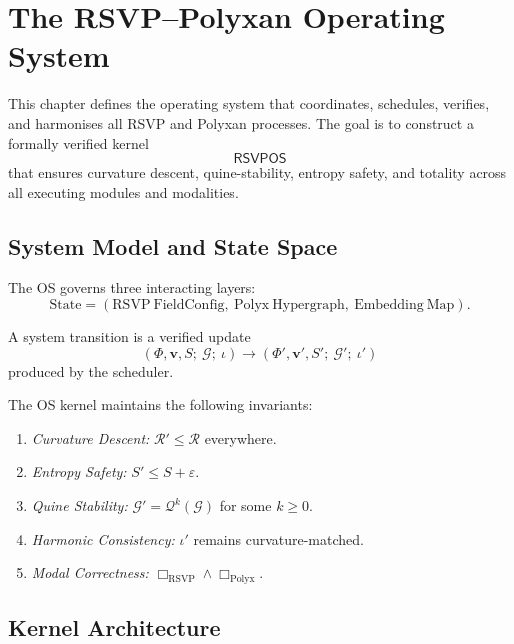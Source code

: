 \chapter{The RSVP--Polyxan Operating System}
\label{ch:60}

This chapter defines the operating system that coordinates, schedules,
verifies, and harmonises all RSVP and Polyxan processes.  
The goal is to construct a formally verified kernel  
\[
\mathsf{RSVPOS}
\]
that ensures curvature descent, quine-stability, entropy safety, and totality
across all executing modules and modalities.

\section{System Model and State Space}
\label{sec:60:model}

The OS governs three interacting layers:
\[
\mathrm{State}
=
(\mathrm{RSVP\ FieldConfig},\ 
 \mathrm{Polyx\ Hypergraph},\
 \mathrm{Embedding\ Map}).
\]

\begin{definition}
A system transition is a verified update
\[
(\Phi,\mathbf{v},S;\ \mathcal{G};\ \iota)
   \longrightarrow
(\Phi',\mathbf{v}',S';\ \mathcal{G}';\ \iota')
\]
produced by the scheduler.
\end{definition}

\begin{definition}
The OS kernel maintains the following invariants:
\begin{enumerate}
  \item \emph{Curvature Descent:} $\mathcal{R}' \le \mathcal{R}$ everywhere.
  \item \emph{Entropy Safety:} $S' \le S + \varepsilon$.
  \item \emph{Quine Stability:} $\mathcal{G}' = \mathcal{Q}^k(\mathcal{G})$ for some $k\ge 0$.
  \item \emph{Harmonic Consistency:} $\iota'$ remains curvature-matched.
  \item \emph{Modal Correctness:} $\Box_{\mathrm{RSVP}}\wedge\Box_{\mathrm{Polyx}}$.
\end{enumerate}
\end{definition}

\section{Kernel Architecture}
\label{sec:60:kernel}

